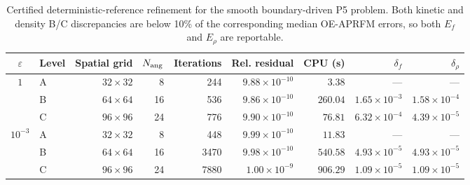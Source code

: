 \begin{table}[t]
\centering
\caption{Certified deterministic-reference refinement for the smooth boundary-driven P5 problem. Both kinetic and density B/C discrepancies are below 10\% of the corresponding median OE-APRFM errors, so both $E_f$ and $E_\rho$ are reportable.}
\label{tab:p5-reference}
\begin{tabular}{clrrrrrrr}
\toprule
$\varepsilon$ & Level & Spatial grid & $N_{\rm ang}$ & Iterations & Rel. residual & CPU (s) & $\delta_f$ & $\delta_\rho$\\
\midrule
$1$ & A & $32\times32$ & 8 & 244 & $9.88\times10^{-10}$ & $3.38$ & --- & ---\\
 & B & $64\times64$ & 16 & 536 & $9.86\times10^{-10}$ & $260.04$ & $1.65\times10^{-3}$ & $1.58\times10^{-4}$\\
 & C & $96\times96$ & 24 & 776 & $9.90\times10^{-10}$ & $76.81$ & $6.32\times10^{-4}$ & $4.39\times10^{-5}$\\
\midrule
$10^{-3}$ & A & $32\times32$ & 8 & 448 & $9.99\times10^{-10}$ & $11.83$ & --- & ---\\
 & B & $64\times64$ & 16 & 3470 & $9.98\times10^{-10}$ & $540.58$ & $4.93\times10^{-5}$ & $4.93\times10^{-5}$\\
 & C & $96\times96$ & 24 & 7880 & $1.00\times10^{-9}$ & $906.29$ & $1.09\times10^{-5}$ & $1.09\times10^{-5}$\\
\bottomrule
\end{tabular}
\end{table}

